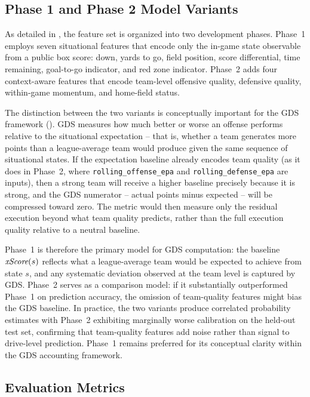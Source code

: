 \subsection{Phase 1 and Phase 2 Model Variants}
\label{sec:phase-comparison}

As detailed in , the \xscore{} feature set is organized
into two development phases. Phase~1 employs seven situational features that
encode only the in-game state observable from a public box score: down,
yards to go, field position, score differential, time remaining, goal-to-go
indicator, and red zone indicator. Phase~2 adds four context-aware features
that encode team-level offensive quality, defensive quality, within-game
momentum, and home-field status.

The distinction between the two variants is conceptually important for
the GDS framework (). GDS measures how much better or worse
an offense performs relative to the situational expectation -- that is, whether
a team generates more points than a league-average team would produce given the
same sequence of situational states. If the expectation baseline already encodes
team quality (as it does in Phase~2, where \texttt{rolling\_offense\_epa} and
\texttt{rolling\_defense\_epa} are inputs), then a strong team will receive a
higher baseline precisely because it is strong, and the GDS numerator -- actual
points minus expected -- will be compressed toward zero. The metric would
then measure only the residual execution beyond what team quality predicts,
rather than the full execution quality relative to a neutral baseline.

Phase~1 is therefore the primary model for GDS computation: the baseline
$\textit{xScore}(s)$ reflects what a league-average team would be expected to achieve
from state $s$, and any systematic deviation observed at the team level is
captured by GDS. Phase~2 serves as a comparison model: if it substantially outperformed
Phase~1 on prediction accuracy, the omission of team-quality features might
bias the GDS baseline. In practice, the two variants produce correlated
probability estimates with Phase~2 exhibiting marginally worse calibration
on the held-out test set, confirming that team-quality features add noise
rather than signal to drive-level prediction. Phase~1 remains preferred for
its conceptual clarity within the GDS accounting framework.

\subsection{Evaluation Metrics}
\label{sec:eval-metrics}

